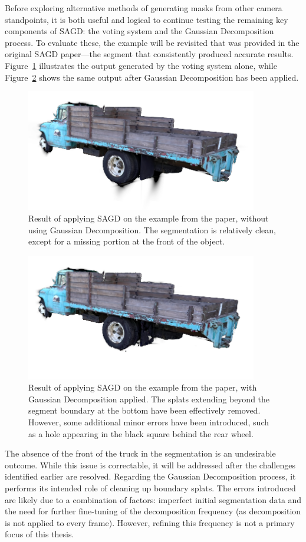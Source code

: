 \documentclass[12pt]{article}
\begin{document}
Before exploring alternative methods of generating masks from other camera standpoints, it is both useful and logical to continue testing the remaining key components of SAGD: the voting system and the Gaussian Decomposition process. To evaluate these, the example will be revisited that was provided in the original SAGD paper—the segment that consistently produced accurate results. Figure~\ref{fig:sagdwithout} illustrates the output generated by the voting system alone, while Figure~\ref{fig:sagdwith} shows the same output after Gaussian Decomposition has been applied.
\begin{figure}[h!]
	\centering
	\includegraphics[width=0.9\textwidth]{Images/nodecomp.png}
	\caption{Result of applying SAGD on the example from the paper, without using Gaussian Decomposition. The segmentation is relatively clean, except for a missing portion at the front of the object.}
	\label{fig:sagdwithout}
\end{figure}
\begin{figure}[h!]
	\centering
	\includegraphics[width=0.9\textwidth]{Images/withdecomp.png}
	\caption{Result of applying SAGD on the example from the paper, with Gaussian Decomposition applied. The splats extending beyond the segment boundary at the bottom have been effectively removed. However, some additional minor errors have been introduced, such as a hole appearing in the black square behind the rear wheel.}
	\label{fig:sagdwith}
\end{figure}
\FloatBarrier
\noindent
The absence of the front of the truck in the segmentation is an undesirable outcome. While this issue is correctable, it will be addressed after the challenges identified earlier are resolved. Regarding the Gaussian Decomposition process, it performs its intended role of cleaning up boundary splats. The errors introduced are likely due to a combination of factors: imperfect initial segmentation data and the need for further fine-tuning of the decomposition frequency (as decomposition is not applied to every frame). However, refining this frequency is not a primary focus of this thesis.
\end{document}
